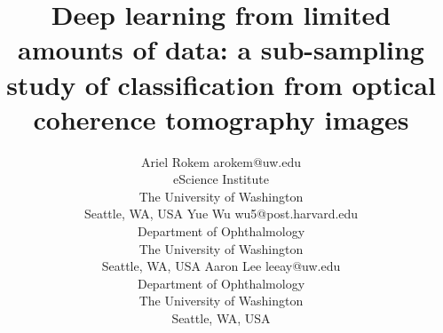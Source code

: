 \documentclass[twoside,11pt]{article}
\begin{document}
\title{Deep learning from limited amounts of data: a sub-sampling study of classification from optical coherence tomography images}

\author{\name Ariel Rokem \email arokem@uw.edu \\
       \addr eScience Institute\\
       The University of Washington\\
       Seattle, WA, USA
       \AND
       \name Yue Wu  \email wu5@post.harvard.edu \\
       \addr Department of Ophthalmology\\
       The University of Washington\\
       Seattle, WA, USA
       \AND
      \name Aaron Lee \email leeay@uw.edu\\
      \addr Department of Ophthalmology\\
      The University of Washington\\
      Seattle, WA, USA}

\maketitle









\end{document}
